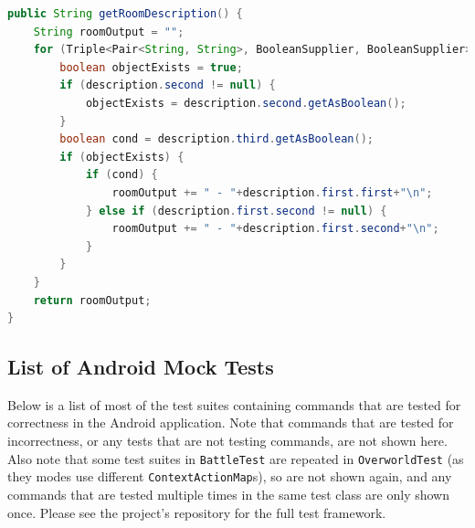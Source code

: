 \documentclass[11pt]{article}
\begin{document}
\begin{lstlisting}[language=Java, caption=Room::getDescription(), label=lst:get-description]
public String getRoomDescription() {
    String roomOutput = "";
    for (Triple<Pair<String, String>, BooleanSupplier, BooleanSupplier> description : mDescriptionList) {
        boolean objectExists = true;
        if (description.second != null) {
            objectExists = description.second.getAsBoolean();
        }
        boolean cond = description.third.getAsBoolean();
        if (objectExists) {
            if (cond) {
                roomOutput += " - "+description.first.first+"\n";
            } else if (description.first.second != null) {
                roomOutput += " - "+description.first.second+"\n";
            }
        }
    }
    return roomOutput;
}
\end{lstlisting}

\newpage
\subsection{List of Android Mock Tests}
\label{appendix:mock-tests}

Below is a list of most of the test suites containing commands that are tested for correctness in the Android application. Note that commands that are tested for incorrectness, or any tests that are not testing commands, are not shown here. Also note that some test suites in \texttt{BattleTest} are repeated in \texttt{OverworldTest} (as they modes use different \texttt{ContextActionMap}s), so are not shown again, and any commands that are tested multiple times in the same test class are only shown once. Please see the project's repository for the full test framework.
\end{document}
